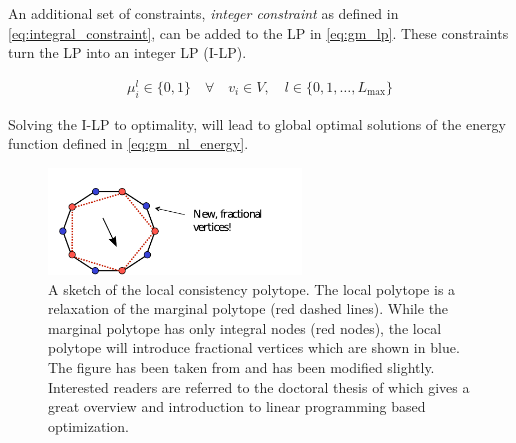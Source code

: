 An additional set of constraints, \emph{integer constraint} as defined in \cref{eq:integral_constraint}, can be added to the LP in \cref{eq:gm_lp}. These constraints turn the LP into an integer LP (I-LP).

\begin{align}
    \mu_i^l \in \{0,1\} \quad \forall \quad v_{i} \in V,
    \quad l \in \{ 0,1,\ldots,L_{\text{max}} \} \label{eq:integral_constraint}
\end{align}

Solving the I-LP to optimality, will lead to 
global optimal solutions of the energy function defined in 
\cref{eq:gm_nl_energy}.







\begin{figure}[H]
\centering
\includegraphics[width=0.6\textwidth]{fig/frac_vert2.pdf}
\caption{
    A sketch of the local consistency polytope.
    The local polytope is a relaxation
    of the marginal polytope (red dashed lines).
    While the marginal polytope has only integral
    nodes (red nodes), the local polytope 
    will introduce fractional vertices which are shown
    in blue.
    The figure has been taken from \citep{sontag_2010_thesis}
    and has been modified slightly.
    Interested readers are referred to the doctoral
    thesis of  \citet{sontag_2010_thesis} which gives
    a great overview and introduction to linear programming
    based optimization.
}\label{fig:local_poly}
\end{figure}






